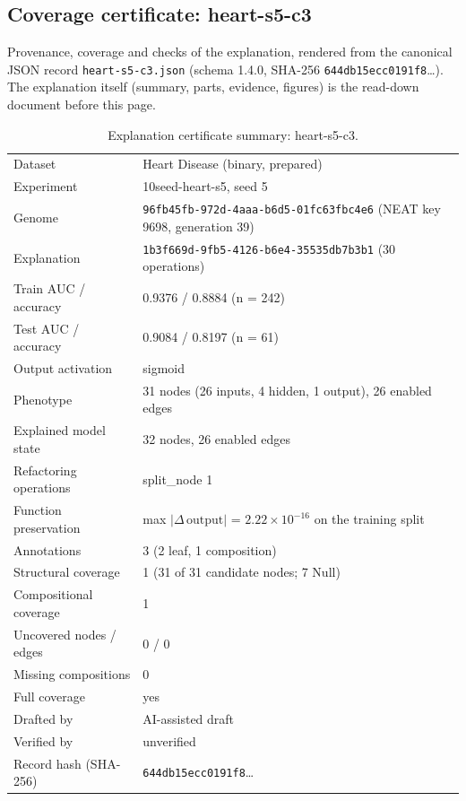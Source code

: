 \providecommand{\explaneatcertdir}[1]{}
\begin{drafted}
\section{Coverage certificate: heart-s5-c3}\label{app:heart-s5-c3:sec}
Provenance, coverage and checks of the explanation, rendered from the canonical JSON record \texttt{heart-s5-c3.json} (schema 1.4.0, SHA-256 \texttt{644db15ecc0191f8}\ldots). The explanation itself (summary, parts, evidence, figures) is the read-down document before this page.

\begin{table}[htbp]
\centering\small
\begin{tabularx}{\linewidth}{@{}lX@{}}
\toprule
Dataset & Heart Disease (binary, prepared) \\
Experiment & 10seed-heart-s5, seed 5 \\
Genome & \texttt{96fb45fb-972d-4aaa-b6d5-01fc63fbc4e6} (NEAT key 9698, generation 39) \\
Explanation & \texttt{1b3f669d-9fb5-4126-b6e4-35535db7b3b1} (30 operations) \\
Train AUC / accuracy & 0.9376 / 0.8884 (n = 242) \\
Test AUC / accuracy & 0.9084 / 0.8197 (n = 61) \\
Output activation & sigmoid \\
Phenotype & 31 nodes (26 inputs, 4 hidden, 1 output), 26 enabled edges \\
Explained model state & 32 nodes, 26 enabled edges \\
Refactoring operations & split\_\allowbreak{}node 1 \\
Function preservation & max $|\Delta\,\mathrm{output}|$ = $2.22\times 10^{-16}$ on the training split \\
Annotations & 3 (2 leaf, 1 composition) \\
Structural coverage & 1 (31 of 31 candidate nodes; 7 Null) \\
Compositional coverage & 1 \\
Uncovered nodes / edges & 0 / 0 \\
Missing compositions & 0 \\
Full coverage & yes \\
Drafted by & AI-assisted draft \\
Verified by & unverified \\
Record hash (SHA-256) & \texttt{644db15ecc0191f8}\ldots \\
\bottomrule
\end{tabularx}
\caption{Explanation certificate summary: heart-s5-c3.}
\label{app:heart-s5-c3:summary}
\end{table}

\end{drafted}
